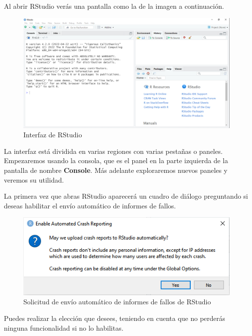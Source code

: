\documentclass[
  title=normal,
  notoc,
  bib=normal]{mnye}
\begin{document}
Al abrir \textsf{RStudio} verás una pantalla como la de la imagen a continuación.

\begin{figure}

{\centering \includegraphics[width=1\linewidth]{images/rstudio-interface} 

}

\caption{Interfaz de RStudio}\label{fig:unnamed-chunk-3}
\end{figure}

La interfaz está dividida en varias regiones con varias pestañas o paneles. Empezaremos usando la consola, que es el panel en la parte izquierda de la pantalla de nombre \textbf{Console}. Más adelante exploraremos nuevos paneles y veremos su utilidad.

\begin{infobox}
La primera vez que abras \textsf{RStudio} aparecerá un cuadro de diálogo preguntando si deseas habilitar el envío automático de informes de fallos.

\begin{figure}

{\centering \includegraphics[width=0.9\linewidth]{images/rstudio-crash-reporting} 

}

\caption{Solicitud de envío automático de informes de fallos de RStudio}\label{fig:unnamed-chunk-4}
\end{figure}

Puedes realizar la elección que desees, teniendo en cuenta que no perderás ninguna funcionalidad si no lo habilitas.

\end{infobox}
\end{document}
